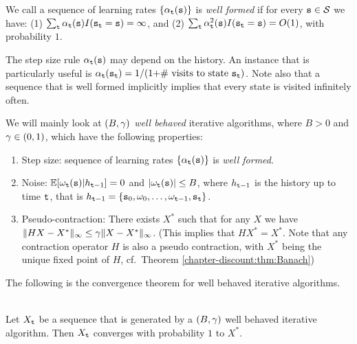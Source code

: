 We call a sequence of learning rates $\{\alpha_{\tt t}({\tt s})\}$ is \emph{well formed} if for every ${\tt s}\in\mathcal{S}$ we have: (1) $\sum_{\tt t}
\alpha_{\tt t}({\tt s})
I({\tt s}_{\tt t}={\tt s})=\infty $, and (2)
$\sum_{\tt t} \alpha_{\tt t}^2({\tt s})
I({\tt s}_{\tt t}={\tt s})=O(1)$, with probability $1$.

\begin{remark}
    The step size rule $\alpha_{\tt t}({\tt s})$ may depend on the history. An instance that is particularly useful is $\alpha_{\tt t}({\tt s}_{{\tt t}}) = 1 / (\textrm{1+\# visits to state } {\tt s}_{{\tt t}})$. Note also that a sequence that is well formed implicitly implies that every state is visited infinitely often.
\end{remark}

We will mainly look at {\em $(B,\gamma)$ well behaved} iterative
algorithms, where $B>0$ and $\gamma\in(0,1)$, which have the
following properties:
\begin{enumerate}
\item Step size: sequence of learning rates $\{\alpha_{\tt t}({\tt s})\}$ is \emph{well formed}.
\item Noise: $\mathbb{E}[\omega_{\tt t}({\tt s})|h_{{\tt t}-1}]=0$ and $|\omega_{\tt t}({\tt s})|\leq B$, where
$h_{{\tt t}-1}$ is the history up to time ${\tt t}$, that is $h_{{\tt t}-1} = \left\{{\tt s}_{0}, \omega_0, \dots, \omega_{{\tt t}-1},{\tt s}_{{\tt t}}\right\}$.
\item Pseudo-contraction: There exists $X^*$ such that for any $X$ we have $\|HX-X^*\|_\infty
\leq \gamma \|X-X^*\|_\infty$. (This implies that $HX^*=X^*$.
Note that any contraction operator $H$ is also a pseudo contraction, with $X^*$ being the unique fixed point of $H$, cf.~Theorem \ref{chapter-discount:thm:Banach})
\end{enumerate}

The following is the convergence theorem for well behaved iterative
algorithms.

\begin{theorem}\ \\
\label{thm:stoch-approx}
 Let $X_{\tt t}$ be a sequence that is generated by a
$(B,\gamma)$ well behaved iterative algorithm. Then $X_{\tt t}$
converges with probability $1$ to $X^*$.
\end{theorem}

